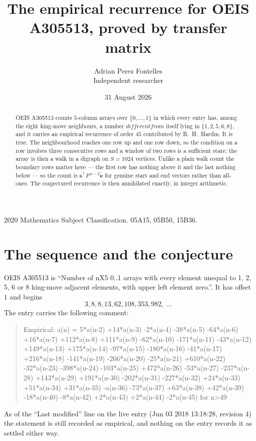 \documentclass[11pt,a4paper]{article}
\title{The empirical recurrence for OEIS A305513, proved by transfer matrix}
\author{Adrian Perez Fontelles\\ \small Independent researcher}
\date{31 August 2026}
\theoremstyle{plain}
\theoremstyle{definition}
\begin{document}
\maketitle

\begin{abstract}
OEIS A305513 counts $5$-column arrays over $\{0,\dots,1\}$ in which every entry has,
among the eight king-move neighbours, a number $different from$ itself lying in $\{1,2,5,6,8\}$, and it carries an empirical
recurrence of order $45$ contributed by R.~H.~Hardin. It is true. The neighbourhood
reaches one row up and one row down, so the condition on a row involves three consecutive
rows and a window of two rows is a sufficient state; the array is then a walk in a digraph
on $S=1024$ vertices. Unlike a plain walk count the boundary rows matter here --- the first
row has nothing above it and the last nothing below --- so the count is
$\mathbf{s}^{\!\top}P^{\,n-2}\mathbf{e}$ for genuine start and end vectors rather than
all-ones. The conjectured recurrence is then annihilated exactly, in integer arithmetic.
\end{abstract}

\noindent\small 2020 Mathematics Subject Classification. 05A15, 05B50, 15B36.\normalsize

\section{The sequence and the conjecture}

OEIS A305513 is ``Number of nX5 0..1 arrays with every element unequal to 1, 2, 5, 6 or 8 king-move adjacent elements, with upper left element zero.''. It has offset
$1$ and begins
\[
3, 8, 8, 13, 62, 108, 353, 982,\ \dots
\]
The entry carries the following comment:
\begin{quote}\small
Empirical: a(n) = 5*a(n-2) +14*a(n-3) -2*a(n-4) -38*a(n-5) -64*a(n-6) +16*a(n-7) +112*a(n-8) +111*a(n-9) -62*a(n-10) -171*a(n-11) -43*a(n-12) +149*a(n-13) +175*a(n-14) -97*a(n-15) -180*a(n-16) -41*a(n-17) +216*a(n-18) -141*a(n-19) -266*a(n-20) -25*a(n-21) +610*a(n-22) -32*a(n-23) -398*a(n-24) -103*a(n-25) +472*a(n-26) -53*a(n-27) -237*a(n-28) +143*a(n-29) +191*a(n-30) -202*a(n-31) -227*a(n-32) +24*a(n-33) +51*a(n-34) +31*a(n-35) -a(n-36) -73*a(n-37) +63*a(n-38) +42*a(n-39) -18*a(n-40) -8*a(n-42) +2*a(n-43) +2*a(n-44) -2*a(n-45) for n>49
\end{quote}
As of the ``Last modified'' line on the live entry (Jun 03 2018 13:18:28, revision
4) the statement is still recorded as empirical, and nothing on the entry
records it as settled either way.
\end{document}
